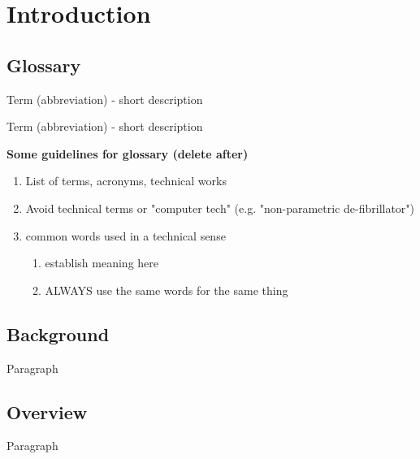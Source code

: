 
\section{Introduction}

\subsection{Glossary}
Term (abbreviation) - short description

Term (abbreviation) - short description


\textbf{Some guidelines for glossary (delete after)}
\begin{enumerate}
    \item List of terms, acronyms, technical works 
    \item Avoid technical terms or "computer tech" (e.g. "non-parametric de-fibrillator")
    \item common words used in a technical sense
    \begin{enumerate}
        \item establish meaning here
        \item ALWAYS use the same words for the same thing 
    \end{enumerate}
\end{enumerate}


\subsection{Background}

 Paragraph

\subsection{Overview}

 Paragraph


















